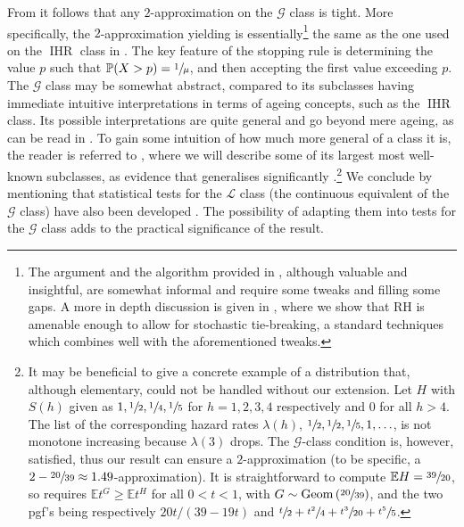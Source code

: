 \documentclass[11pt, a4paper, twoside]{article}
\newcommand{\EE}{\mathbb{E}}
\newcommand{\PP}{\mathbb{P}}
\newcommand{\PGF}{\mathcal{G}}
\DeclareMathOperator{\Geom}{Geom}
\DeclareMathOperator{\IHR}{IHR}
\numberwithin{equation}{section}
\begin{document}
	From \cite[Theorem~3.5]{AliBanGolMunWan20} it follows that any $2$-approximation on the $\PGF$ class is tight. More specifically, the $2$-approximation yielding  is essentially\footnote{The argument and the algorithm provided in \cite{AliBanGolMunWan20}, although valuable and insightful, are somewhat informal and require some tweaks and filling some gaps. A more in depth discussion is given in , where we show that RH is amenable enough to allow for stochastic tie-breaking, a standard techniques which combines well with the aforementioned tweaks.} the same as the one used on the $\IHR$ class in \cite[Theorem~3.1]{AliBanGolMunWan20}. The key feature of the stopping rule is determining the value $p$ such that $\PP(X>p)=\sfrac{1}{\mu}$, and then accepting the first value exceeding $p$. The $\PGF$ class may be somewhat abstract, compared to its subclasses having immediate intuitive interpretations in terms of ageing concepts, such as the $\IHR$ class. Its possible interpretations are quite general and go beyond mere ageing, as can be read in \cite{Klef83a}. To gain some intuition of how much more general of a class it is, the reader is referred to , where we will describe some of its largest most well-known subclasses, as evidence that  generalises significantly \cite[Theorem~3.1,~Theorem~3.2]{AliBanGolMunWan20}.\footnote{It may be beneficial to give a concrete example of a distribution that, although elementary, could not be handled without our extension. Let $H$ with $S(h)$ given as $1, \sfrac{1}{2}, \sfrac{1}{4}, \sfrac{1}{5}$ for $h=1,2,3,4$ respectively and $0$ for all $h>4$. The list of the corresponding hazard rates $\lambda(h)$, $\sfrac{1}{2}, \sfrac{1}{2}, \sfrac{1}{5}, 1,\ldots$, is not monotone increasing because $\lambda(3)$ drops. The $\PGF$-class condition is, however, satisfied, thus our result can ensure a $2$-approximation (to be specific, a $2-\sfrac{20}{39}\approx1.49$-approximation). It is straightforward to compute $\EE H =\sfrac{39}{20}$, so  requires $\EE t^G\ge\EE t^H$ for all $0<t<1$, with $G\sim\Geom\left(\sfrac{20}{39}\right)$, and the two pgf's being respectively $20t/(39-19t)$ and $\sfrac{t}{2}+\sfrac{t^2}{4}+\sfrac{t^3}{20}+\sfrac{t^5}{5}$.} We conclude by mentioning that statistical tests for the $\mathcal{L}$ class (the continuous equivalent of the $\PGF$ class) have also been developed \cite{Kle83b}. The possibility of adapting them into tests for the $\PGF$ class adds to the practical significance of the result.
	
\end{document}
